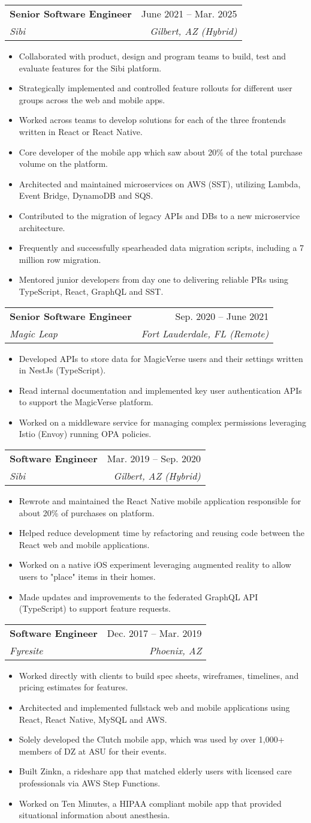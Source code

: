 \documentclass[letterpaper,11pt]{article}
\makeatletter
\newcommand{\resumeItem}[1]{
  \item\small{
    {#1 \vspace{-2pt}}
  }
}
\newcommand{\resumeSubheading}[4]{
  \vspace{-2pt}\item
    \begin{tabular*}{0.97\textwidth}[t]{l@{\extracolsep{\fill}}r}
      \textbf{#1} & #2 \\
      \textit{\small#3} & \textit{\small #4} \\
    \end{tabular*}\vspace{-7pt}
}
\newcommand{\resumeItemListStart}{\begin{itemize}}
\newcommand{\resumeItemListEnd}{\end{itemize}\vspace{-5pt}}
\makeatother
\begin{document}
    \resumeSubheading
      {Senior Software Engineer}{June 2021 -- Mar. 2025}
      {Sibi}{Gilbert, AZ (Hybrid)}
      \resumeItemListStart
        \resumeItem{Collaborated with product, design and program teams to build, test and evaluate features for the Sibi platform.}
        \resumeItem{Strategically implemented and controlled feature rollouts for different user groups across the web and mobile apps.}
        \resumeItem{Worked across teams to develop solutions for each of the three frontends written in React or React Native.}
        \resumeItem{Core developer of the mobile app which saw about 20\% of the total purchase volume on the platform.}
        \resumeItem{Architected and maintained microservices on AWS (SST), utilizing Lambda, Event Bridge, DynamoDB and SQS.}
        \resumeItem{Contributed to the migration of legacy APIs and DBs to a new microservice architecture.}
        \resumeItem{Frequently and successfully spearheaded data migration scripts, including a 7 million row migration.}
        \resumeItem{Mentored junior developers from day one to delivering reliable PRs using TypeScript, React, GraphQL and SST.}
      \resumeItemListEnd

    \resumeSubheading
      {Senior Software Engineer}{Sep. 2020 -- June 2021}
      {Magic Leap}{Fort Lauderdale, FL (Remote)}
      \resumeItemListStart
        \resumeItem{Developed APIs to store data for MagicVerse users and their settings written in NestJs (TypeScript).}
        \resumeItem{Read internal documentation and implemented key user authentication APIs to support the MagicVerse platform.}
        \resumeItem{Worked on a middleware service for managing complex permissions leveraging Istio (Envoy) running OPA policies.}
      \resumeItemListEnd

    \resumeSubheading
      {Software Engineer}{Mar. 2019 -- Sep. 2020}
      {Sibi}{Gilbert, AZ (Hybrid)}
      \resumeItemListStart
        \resumeItem{Rewrote and maintained the React Native mobile application responsible for about 20\% of purchases on platform.}
        \resumeItem{Helped reduce development time by refactoring and reusing code between the React web and mobile applications.}
        \resumeItem{Worked on a native iOS experiment leveraging augmented reality to allow users to "place" items in their homes.}
        \resumeItem{Made updates and improvements to the federated GraphQL API (TypeScript) to support feature requests.}
      \resumeItemListEnd

    \resumeSubheading
      {Software Engineer}{Dec. 2017 -- Mar. 2019}
      {Fyresite}{Phoenix, AZ}
      \resumeItemListStart
        \resumeItem{Worked directly with clients to build spec sheets, wireframes, timelines, and pricing estimates for features.}
        \resumeItem{Architected and implemented fullstack web and mobile applications using React, React Native, MySQL and AWS.}
        \resumeItem{Solely developed the Clutch mobile app, which was used by over 1,000+ members of DZ at ASU for their events.}
        \resumeItem{Built Zinkn, a rideshare app that matched elderly users with licensed care professionals via AWS Step Functions.}
        \resumeItem{Worked on Ten Minutes, a HIPAA compliant mobile app that provided situational information about anesthesia.}
      \resumeItemListEnd
\end{document}
